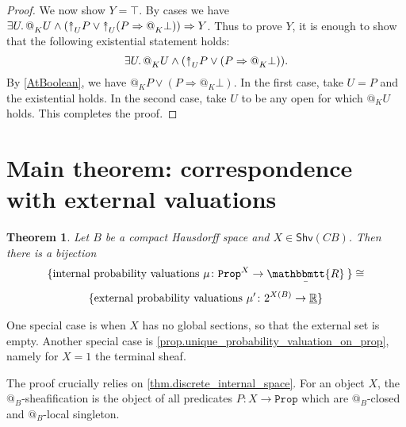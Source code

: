 \documentclass[11pt, oneside, article]{memoir}
\makeatletter
\theoremstyle{plain}
\newtheorem{theorem}{Theorem}[chapter] %
\theoremstyle{definition}
\theoremstyle{remark}
\newcommand{\const}[1]{\mathtt{#1}}
\newcommand{\Fun}[1]{\mathsf{#1}}
\newcommand{\tn}[1]{\textnormal{#1}}
\newcommand{\ul}[1]{\underline{#1}}
\newcommand{\ubar}[1]{\underaccent{\bar}{#1}}
\newcommand{\internal}[1]{\raisebox{-.03ex}{$\mathbbmtt{#1}$}}
\newcommand{\hs}{\hspace{1.1pt}}
\newcommand{\LR}{\ul{\mathbb{R}}}
\newcommand{\tRR}{\internal{R}\hs}
\newcommand{\tLR}{\ubar{\tRR}\hs}
\newcommand{\Shv}{\Fun{Shv}}
\newcommand{\Prop}{\const{Prop}}
\newcommand{\BaseSpace}{B}
\newcommand{\AtSymbol}{{@}}
\newcommand{\InSymbol}{{\upclose}}%
\newcommand{\At}[2][]{\AtSymbol^{#1}_{#2}}
\newcommand{\In}[2][]{\InSymbol^{#1}_{#2}}
\newcommand{\upclose}{{\rotatebox[origin=c]{90}{$\twoheadrightarrow$}}}
\newcommand{\imp}{\Rightarrow}
\makeatother
\begin{document}
\begin{proof}
We now show $Y=\top$. By cases we have $\exists U\ldotp\At{K}U\wedge(\In{U}P\vee\In{U}(P\imp\At{K}\bot))\imp Y$. Thus to prove $Y$, it is enough to show that the following existential statement holds:
\[\exists U\ldotp\At{K}U\wedge(\In{U}P\vee(P\imp\At{K}\bot)).\]
By \cref{AtBoolean}, we have $\At{K}P\vee (P\imp\At{K}\bot)$. In the first case, take $U=P$ and the existential holds. In the second case, take $U$ to be any open for which $\At{K}U$ holds. This completes the proof.
\end{proof}


\section{Main theorem: correspondence with external valuations}


\begin{theorem}\label{conj.may8}
Let $\BaseSpace$ be a compact Hausdorff space and $X\in\Shv(C\BaseSpace)$. Then there is a bijection
\begin{multline*}
  \{\tn{internal probability valuations } \mu\colon \Prop^X \to\tLR\}
	\cong\\[4pt]
	\{\tn{external probability valuations } \mu'\colon 2^{X(B)} \to\LR\}
\end{multline*}
\end{theorem}

One special case is when $X$ has no global sections, so that the external set is empty. Another special case is \cref{prop.unique_probability_valuation_on_prop}, namely for $X = 1$ the terminal sheaf.

The proof crucially relies on \cref{thm.discrete_internal_space}. For an object $X$, the $\At{B}$-sheafification is the object of all predicates $P : X \to \Prop$ which are $\At{B}$-closed and $\At{B}$-local singleton. 
\end{document}
